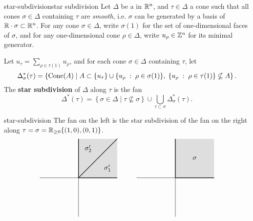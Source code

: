 \begin{topic}{star-subdivision}{star subdivision}
    Let $\Delta$ be a  in $\mathbb{R}^n$, and $\tau \in \Delta$ a cone such that all cones $\sigma \in \Delta$ containing $\tau$ are \textit{smooth}, i.e. $\sigma$ can be generated by a basis of $\mathbb{R} \cdot \sigma \subset \mathbb{R}^n$. For any cone $\sigma \in \Delta$, write $\sigma(1)$ for the set of one-dimensional faces of $\sigma$, and for any one-dimensional cone $\rho \in \Delta$, write $u_\rho \in \mathbb{Z}^n$ for its minimal generator.
    
    Let $u_\tau = \sum_{\rho \in \tau(1)} u_\rho$, and for each cone $\sigma \in \Delta$ containing $\tau$, let
    \[ \Delta^*_\sigma(\tau) = \left\{ \textup{Cone}(A) \mid A \subset \{ u_\tau \} \cup \{ u_\rho \;:\; \rho \in \sigma(1) \}, \; \{ u_\rho \;:\; \rho \in \tau(1) \} \nsubseteq A \right\} . \]
    The \textbf{star subdivision} of $\Delta$ along $\tau$ is the fan
    \[ \Delta^*(\tau) = \left\{ \sigma \in \Delta \mid \tau \nsubseteq \sigma \right\} \cup \bigcup_{\tau \subset \sigma} \Delta^*_\sigma(\tau) . \]
\end{topic}

\begin{example}{star-subdivision}
    The fan on the left is the star subdivision of the fan on the right along $\tau = \sigma = \mathbb{R}_{\ge 0} \{ (1, 0), (0, 1) \}$.
    \[ \begin{tikzpicture}
        \begin{scope}[shift={(-5,0)}]
            \draw (-2, 0) -- (2, 0);
            \draw (0, -2) -- (0, 2);
            \fill[fill=gray!50, opacity=0.5] (0, 0) -- (0, 2) -- (2, 2) -- (2, 0);
            \draw[thick] (0, 0) -- (2, 0);
            \draw[thick] (0, 0) -- (0, 2);
            \draw[thick] (0, 0) -- (2, 2);
            \node at (1.5, 0.5) {$\sigma'_1$};
            \node at (0.5, 1.5) {$\sigma'_2$};
        \end{scope}
        \begin{scope}
            \draw (-2, 0) -- (2, 0);
            \draw (0, -2) -- (0, 2);
            \fill[fill=gray!50, opacity=0.5] (0, 0) -- (0, 2) -- (2, 2) -- (2, 0);
            \draw[thick] (0, 0) -- (2, 0);
            \draw[thick] (0, 0) -- (0, 2);
            \node at (1, 1) {$\sigma$};
        \end{scope}
    \end{tikzpicture} \]
\end{example}

